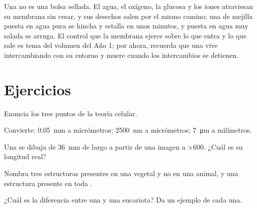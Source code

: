 \begin{remark}\label{rem:g10:cells-common-unit:open}
Una  no es una bolsa sellada. El agua, el oxígeno, la glucosa y
los iones atraviesan su membrana sin cesar, y sus desechos salen por el
mismo camino; una  de mejilla puesta en agua pura se hincha y
estalla en unos minutos, y puesta en agua muy salada se arruga. El
control que la membrana ejerce sobre lo que entra y lo que sale es tema
del volumen del Año 1; por ahora, recuerda que una  vive
intercambiando con su entorno y muere cuando los intercambios se
detienen.
\end{remark}

\section{Ejercicios}

\begin{exercise}[$\star$]\label{exo:g10:cells-common-unit:1}
Enuncia los tres puntos de la teoría celular.
\end{exercise}

\begin{exercise}[$\star$]\label{exo:g10:cells-common-unit:2}
Convierte: \qty{0.05}{mm} a micrómetros; \qty{2500}{nm} a micrómetros;
\qty{7}{\micro m} a milímetros.
\end{exercise}

\begin{exercise}[$\star$]\label{exo:g10:cells-common-unit:3}
Una  se dibuja de \qty{36}{mm} de largo a partir de una imagen a
$\times 600$. ¿Cuál es su longitud real?
\end{exercise}

\begin{exercise}[$\star$]\label{exo:g10:cells-common-unit:4}
Nombra tres estructuras presentes en una  vegetal y no en una
animal, y una estructura presente en toda .
\end{exercise}

\begin{exercise}[$\star$]\label{exo:g10:cells-common-unit:5}
¿Cuál es la diferencia entre una  y una eucariota? Da
un ejemplo de cada una.
\end{exercise}


